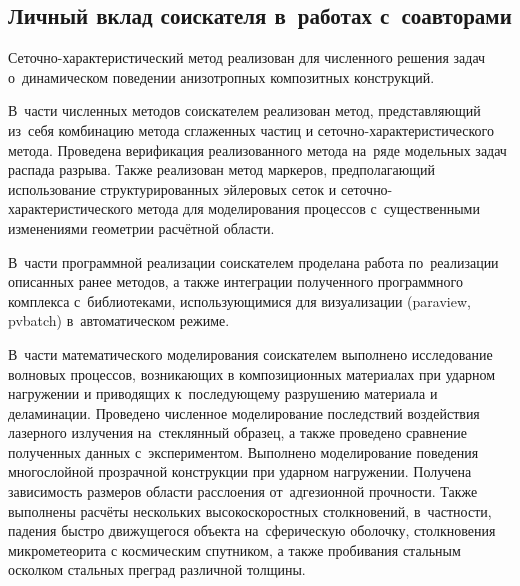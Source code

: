 \documentclass[thesis.tex]{subfiles}
\begin{document}
\subsection*{Личный вклад соискателя в~работах с~соавторами}

Сеточно-характеристический метод реализован для численного решения задач о~динамическом поведении анизотропных
композитных конструкций.

В~части численных методов соискателем реализован метод, представляющий из~себя комбинацию метода сглаженных частиц и
сеточно-ха\-рак\-те\-рис\-ти\-чес\-ко\-го метода. Проведена верификация реализованного метода на~ряде модельных задач
распада разрыва. Также реализован метод маркеров, предполагающий использование структурированных эйлеровых сеток и
сеточно-характеристического метода для моделирования процессов с~существенными изменениями геометрии расчётной
области.

В~части программной реализации соискателем проделана работа по~реализации описанных ранее методов, а также
интеграции полученного программного комплекса с~библиотеками, использующимися для визуализации (paraview, pvbatch)
в~автоматическом режиме.

В~части математического моделирования соискателем выполнено исследование волновых процессов, возникающих в
композиционных материалах при ударном нагружении и приводящих к~последующему разрушению материала и деламинации.
Проведено численное моделирование последствий воздействия лазерного излучения на~стеклянный образец, а также
проведено сравнение полученных данных с~экспериментом. Выполнено моделирование поведения многослойной прозрачной
конструкции при ударном нагружении. Получена зависимость размеров области расслоения от~адгезионной прочности. Также
выполнены расчёты нескольких высокоскоростных столкновений, в~частности, падения быстро движущегося объекта на~сферическую
оболочку, столкновения микрометеорита с космическим спутником, а также пробивания стальным осколком стальных преград различной толщины.
\end{document}
